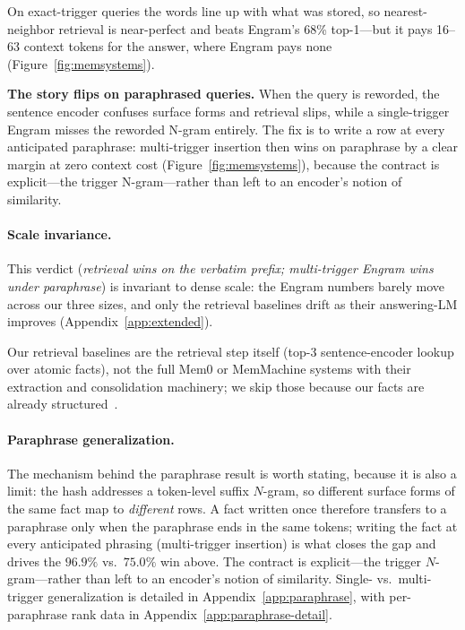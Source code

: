 \documentclass[11pt]{article}
\begin{document}
On exact-trigger queries the words line up with what was stored, so
nearest-neighbor retrieval is near-perfect and beats Engram's 68\%
top-1---but it pays 16--63 context tokens for the answer, where Engram
pays none (Figure~\ref{fig:memsystems}).

\textbf{The story flips on paraphrased queries.} When the query
is reworded, the sentence encoder confuses surface forms and
retrieval slips, while a single-trigger Engram misses the
reworded N-gram entirely. The fix is to write a row at every
anticipated paraphrase: multi-trigger insertion then wins on
paraphrase by a clear margin at zero context cost
(Figure~\ref{fig:memsystems}), because the contract is
explicit---the trigger N-gram---rather than left to an encoder's
notion of similarity.

\paragraph{Scale invariance.} This verdict (\emph{retrieval wins on
the verbatim prefix; multi-trigger Engram wins under paraphrase}) is
invariant to dense scale: the Engram numbers barely move across
our three sizes, and only the retrieval baselines drift as their
answering-LM improves (Appendix~\ref{app:extended}).

Our retrieval baselines are the retrieval step itself (top-3
sentence-encoder lookup over atomic facts), not the full Mem0 or
MemMachine systems with their extraction and consolidation
machinery; we skip those because our facts are already
structured~\citep{maharana2024locomo,wu2024longmemeval}.

\paragraph{Paraphrase generalization.}
\label{sec:paraphrase}
The mechanism behind the paraphrase result is worth stating, because
it is also a limit: the hash addresses a token-level suffix
$N$-gram, so different surface forms of the same fact map to
\emph{different} rows. A fact written once therefore transfers to a
paraphrase only when the paraphrase ends in the same tokens; writing
the fact at every anticipated phrasing (multi-trigger insertion) is
what closes the gap and drives the $96.9\%$ vs.\ $75.0\%$ win above.
The contract is explicit---the trigger $N$-gram---rather than left to
an encoder's notion of similarity. Single- vs.\ multi-trigger
generalization is detailed in Appendix~\ref{app:paraphrase}, with
per-paraphrase rank data in Appendix~\ref{app:paraphrase-detail}.
\end{document}

